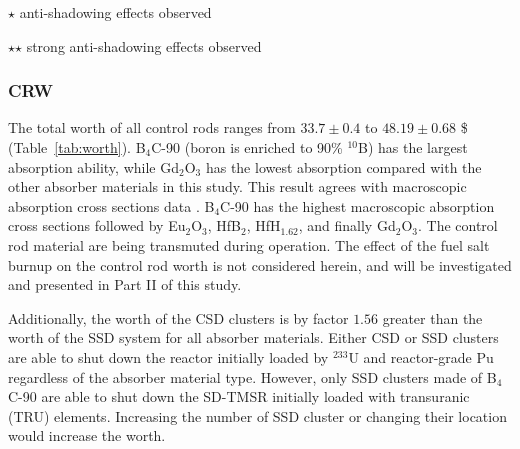 \begin{sidewaystable}
	\begin{tablenotes}
		\tiny
		\item  $\star$  anti-shadowing effects observed
		\item  $\star$$\star$ strong anti-shadowing effects observed
	\end{tablenotes}
	\label{tab:worth}
\end{sidewaystable}

\subsubsection{CRW} \label{CR_worth}

The total worth of all control rods ranges from $33.7\pm0.4$ to $48.19\pm0.68$ 
\$ (Table~\ref{tab:worth}). B$_4$C-90 (boron is enriched to 90\% $^{10}$B) 
has the largest absorption ability, while Gd$_2$O$_3$ has the lowest 
absorption compared with the other absorber materials in this study. This 
result agrees with macroscopic absorption cross sections data 
\cite{guo2019optimized}. B$_4$C-90 has the highest macroscopic 
absorption cross sections followed by Eu$_2$O$_3$, HfB$_2$, HfH$_{1.62}$, and 
finally Gd$_2$O$_3$. The control rod material are being transmuted during 
operation. The effect of the fuel salt burnup on the control rod worth is not 
considered herein, and will be investigated and presented in Part II of this 
study.

Additionally, the worth of the CSD clusters is by factor $1.56$ greater than 
the worth of the SSD system for all absorber materials. Either CSD or SSD 
clusters are able to shut down the reactor initially loaded by 
$^{233}$U and reactor-grade Pu regardless of the absorber material type. 
However, only SSD clusters made of B$_4$C-90 are able to shut down the SD-TMSR 
initially loaded with transuranic (TRU) elements. Increasing the number of SSD 
cluster or changing their location would increase the worth.

